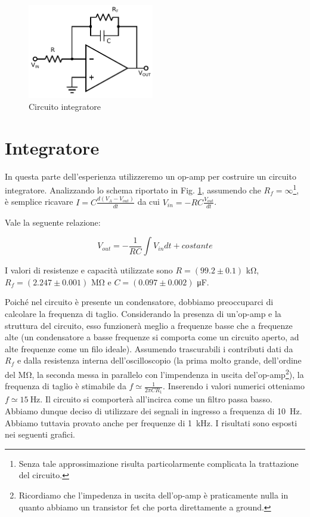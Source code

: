 \begin{figure}
	\includegraphics[width=55mm]{ccint.pdf}
	\caption{Circuito integratore}
	\label{fig:ccint}
\end{figure}

\section{Integratore}

In questa parte dell'esperienza utilizzeremo un op-amp per costruire un circuito integratore. Analizzando lo schema riportato in Fig. \ref{fig:ccint}, assumendo che $R_f=\infty$\footnote{Senza tale approssimazione risulta particolarmente complicata la trattazione del circuito.}, è semplice ricavare $I=C\frac{d(V_A-V_{out})}{dt}$ da cui $V_{in}=-RC\frac{V_{out}}{dt}$.

Vale la seguente relazione:%

\begin{equation}
V_{out}=-\frac{1}{RC} \int V_{in}dt +costante
\label{eq:int}
\end{equation}

I valori di resistenze e capacità utilizzate sono $R=(99.2 \pm 0.1)$ \si{\kilo\ohm},\\
$R_f=(2.247 \pm 0.001)$ \si{\mega\ohm} e $C=(0.097 \pm 0.002)$ \si{\micro\farad}. 

Poiché nel circuito è presente un condensatore, dobbiamo preoccuparci di calcolare la frequenza di taglio.
Considerando la presenza di un'op-amp e la struttura del circuito, esso funzionerà meglio a frequenze basse che a frequenze alte (un condensatore a basse frequenze si comporta come un circuito aperto, ad alte frequenze come un filo ideale).
Assumendo trascurabili i contributi dati da $R_f$ e dalla resistenza interna dell'oscilloscopio (la prima molto grande, dell'ordine del $\si{\mega\ohm}$, la seconda messa in parallelo con l'impendenza in uscita del'op-amp\footnote{Ricordiamo che l'impedenza in uscita dell'op-amp è praticamente nulla in quanto abbiamo un transistor fet che porta direttamente a ground.}), la frequenza di taglio è stimabile da $f\simeq \frac{1}{2\pi C R_1}$.
Inserendo i valori numerici otteniamo $f \simeq \SI{15}{\hertz}$.
Il circuito si comporterà all'incirca come un filtro passa basso.
Abbiamo dunque deciso di utilizzare dei segnali in ingresso a frequenza di \SI{10}{\hertz}.
Abbiamo tuttavia provato anche per frequenze di \SI{1}{\kilo\hertz}.
I risultati sono esposti nei seguenti grafici.

